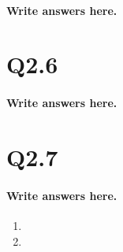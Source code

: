 \documentclass{article}
\begin{document}
\paragraph{Write answers here.}

\section*{Q2.6}
\paragraph{Write answers here.}

\section*{Q2.7}
\paragraph{Write answers here.}
\begin{enumerate}[label=\alph*]
    \item
    \item
\end{enumerate}

\newpage
\end{document}
